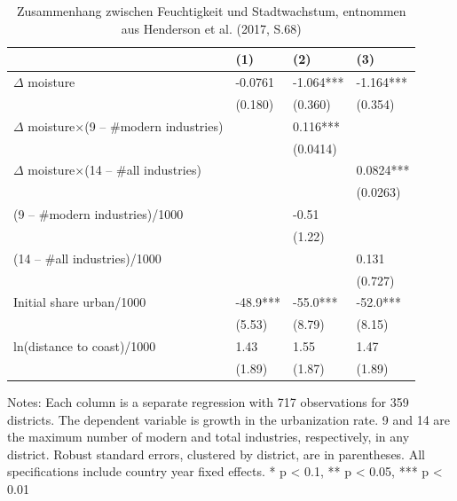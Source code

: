 \begin{table}[!hbt]
\caption{Zusammenhang zwischen Feuchtigkeit und Stadtwachstum,
entnommen aus Henderson et al. (2017, S.68) }
\label{tbl1}
\centering
\begin{threeparttable}
  \begin{tabular}{llll} 

    \toprule
                                                & (1)      & (2)       & (3)        \\ 
    \midrule
    $\Delta$ moisture                           & -0.0761  & -1.064*** & -1.164***  \\
                                                & (0.180)  & (0.360)   & (0.354)    \\
    $\Delta$ moisture×(9 – \#modern industries) & ~        & 0.116***  & ~          \\
                                                & ~        & (0.0414)  & ~          \\
    $\Delta$ moisture×(14 – \#all industries)   & ~        & ~         & 0.0824***  \\
                                                & ~        & ~         & (0.0263)   \\
    (9 – \#modern industries)/1000              & ~        & -0.51     & ~          \\
                                                & ~        & (1.22)    & ~          \\
    (14 – \#all industries)/1000                & ~        & ~         & 0.131      \\
                                                & ~        & ~         & (0.727)    \\
    Initial share urban/1000                    & -48.9*** & -55.0***  & -52.0***   \\
                                                & (5.53)   & (8.79)    & (8.15)     \\
    ln(distance to coast)/1000                  & 1.43     & 1.55      & 1.47       \\
                                                & (1.89)   & (1.87)    & (1.89)     \\
    \bottomrule
    \end{tabular}
    
    \begin{tablenotes}
       \item \small Notes: Each column is a separate regression with 717 observations for 359 districts. The   dependent variable is growth in the urbanization rate. 9 and 14 are the maximum number of modern and total industries, respectively, in any district. Robust standard errors, clustered by district, are in parentheses. All specifications include country year fixed effects. * p < 0.1, ** p < 0.05, *** p < 0.01 
    \end{tablenotes}


\end{threeparttable}
\end{table}

